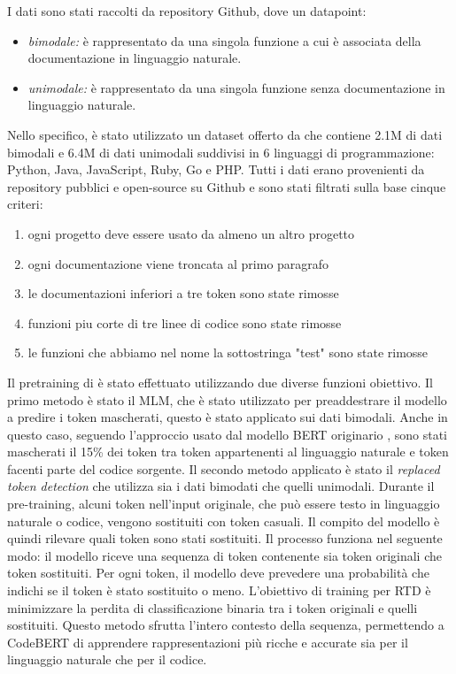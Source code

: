 \documentclass[../../Thesis.tex]{subfiles}
\begin{document}
I dati sono stati raccolti da repository Github, dove un datapoint:
\begin{itemize}
    \item \emph{bimodale:} è rappresentato da una singola funzione a cui è associata della documentazione in linguaggio naturale.
    \item \emph{unimodale:} è rappresentato da una singola funzione senza documentazione in 
    linguaggio naturale.
\end{itemize}
Nello specifico, è stato utilizzato un dataset offerto da \cite{CodeBERTDataset} che contiene 2.1M di dati bimodali e 6.4M di dati unimodali suddivisi in 6 linguaggi di programmazione: Python, Java, JavaScript, Ruby, Go e PHP. Tutti i dati erano provenienti da repository pubblici e open-source su Github e sono stati filtrati sulla base cinque criteri:
\begin{enumerate}
    \item ogni progetto deve essere usato da almeno un altro progetto 
    \item ogni documentazione viene troncata al primo paragrafo
    \item le documentazioni inferiori a tre token sono state rimosse
    \item funzioni piu corte di tre linee di codice sono state rimosse
    \item le funzioni che abbiamo nel nome la sottostringa "test" sono state rimosse
\end{enumerate}
Il pretraining di è stato effettuato utilizzando due diverse funzioni obiettivo. Il primo metodo è stato il MLM, che è stato utilizzato per preaddestrare il modello a predire i token mascherati, questo è stato applicato sui dati bimodali. Anche in questo caso, seguendo l'approccio usato dal modello BERT originario \cite{BERT},  sono stati mascherati il 15\% dei token tra token appartenenti al linguaggio naturale e token facenti parte del codice sorgente. Il secondo metodo applicato è stato il \emph{replaced token detection} che utilizza sia i dati bimodati che quelli unimodali.  Durante il pre-training, alcuni token nell'input originale, che può essere testo in linguaggio naturale o codice, vengono sostituiti con token casuali. Il compito del modello è quindi rilevare quali token sono stati sostituiti. Il processo funziona nel seguente modo: il modello riceve una sequenza di token contenente sia token originali che token sostituiti. Per ogni token, il modello deve prevedere una probabilità che indichi se il token è stato sostituito o meno. L'obiettivo di training per RTD è minimizzare la perdita di classificazione binaria tra i token originali e quelli sostituiti. Questo metodo sfrutta l'intero contesto della sequenza, permettendo a CodeBERT di apprendere rappresentazioni più ricche e accurate sia per il linguaggio naturale che per il codice.
\end{document}
